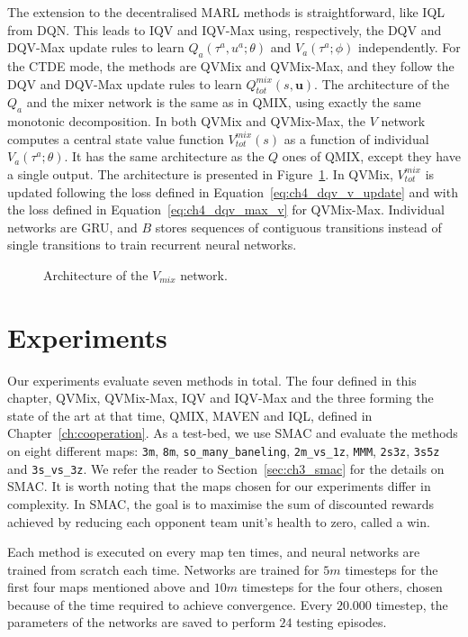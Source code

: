 The extension to the decentralised MARL methods is straightforward, like IQL from DQN.
This leads to IQV and IQV-Max using, respectively, the DQV and DQV-Max update rules to learn $Q_a(\tau^a, u^a;\theta)$ and $V_a(\tau^a;\phi)$ independently.
For the CTDE mode, the methods are QVMix and QVMix-Max, and they follow the DQV and DQV-Max update rules to learn $Q^{mix}_{tot}(s, \mathbf{u})$.
The architecture of the $Q_a$ and the mixer network is the same as in QMIX, using exactly the same monotonic decomposition.
In both QVMix and QVMix-Max, the $V$ network computes a central state value function $V^{mix}_{tot}(s)$ as a function of individual $V_a(\tau^a;\theta)$.
It has the same architecture as the $Q$ ones of QMIX, except they have a single output. 
The architecture is presented in Figure~\ref{fig:ch4_qvmix}.
In QVMix, $V^{mix}_{tot}$ is updated following the loss defined in Equation~\ref{eq:ch4_dqv_v_update} and with the loss defined in Equation~\ref{eq:ch4_dqv_max_v} for QVMix-Max.
Individual networks are GRU, and $B$ stores sequences of contiguous transitions instead of single transitions to train recurrent neural networks.

\begin{figure}
\centering

\caption{Architecture of the $V_{mix}$ network.}
\label{fig:ch4_qvmix}
\end{figure}


\section{Experiments} \label{sec:ch4_experiments}

Our experiments evaluate seven methods in total.
The four defined in this chapter, QVMix, QVMix-Max, IQV and IQV-Max and the three forming the state of the art at that time, QMIX, MAVEN and IQL, defined in Chapter~\ref{ch:cooperation}.
As a test-bed, we use SMAC and evaluate the methods on eight different maps: \texttt{3m}, \texttt{8m}, \texttt{so\_many\_baneling}, \texttt{2m\_vs\_1z}, \texttt{MMM}, \texttt{2s3z}, \texttt{3s5z} and \texttt{3s\_vs\_3z}. 
We refer the reader to Section~\ref{sec:ch3_smac} for the details on SMAC.
It is worth noting that the maps chosen for our experiments differ in complexity. 
In SMAC, the goal is to maximise the sum of discounted rewards achieved by reducing each opponent team unit's health to zero, called a win.

Each method is executed on every map ten times, and neural networks are trained from scratch each time.
Networks are trained for $5m$ timesteps for the first four maps mentioned above and $10m$ timesteps for the four others, chosen because of the time required to achieve convergence.
Every $20.000$ timestep, the parameters of the networks are saved to perform $24$ testing episodes.


